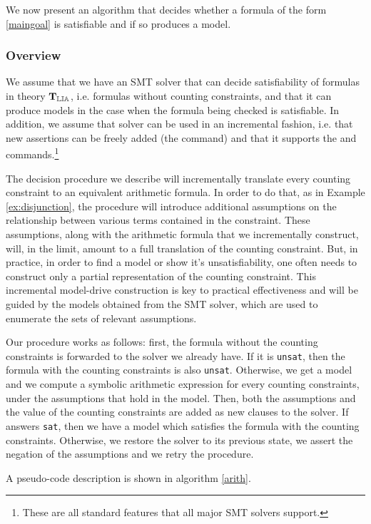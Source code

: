We now present an algorithm that decides whether a formula of the form
\ref{maingoal} is satisfiable and if so produces a model.

\subsubsection{Overview}

We assume that we have an SMT solver \solver that can decide
satisfiability of formulas in theory $\operatorname{\mathbf{T}_\mathbb{LIA}}$, i.e. formulas without
counting constraints, and that it can produce models in the case when
the formula being checked is satisfiable. In addition, we assume that
solver \solver can be used in an incremental fashion, i.e. that new
assertions can be freely added (the \assert command) and that it supports the \push and \pop
commands.\footnote{These are all standard features that all major SMT
solvers support.}

The decision procedure we describe will incrementally translate every
counting constraint to an equivalent arithmetic formula. In order to
do that, as in Example \ref{ex:disjunction}, the procedure will
introduce additional assumptions on the relationship between various
terms contained in the constraint. These assumptions, along with the
arithmetic formula that we incrementally construct, will, in the
limit, amount to a full translation of the counting constraint. But,
in practice, in order to find a model or show it's unsatisfiability,
one often needs to construct only a partial representation of the
counting constraint. This incremental model-drive construction is key
to practical effectiveness and will be guided by the models obtained
from the SMT solver, which are used to enumerate the sets of relevant
assumptions.

Our procedure works as follows: first, the formula without the
counting constraints is forwarded to the solver we already have. If it
is \texttt{unsat}, then the formula with the counting constraints is
also \texttt{unsat}. Otherwise, we get a model and we compute a
symbolic arithmetic expression for every counting constraints, under
the assumptions that hold in the model. Then, both the assumptions and
the value of the counting constraints are added as new clauses to the
solver. If \solver answers \texttt{sat}, then we have a model
which satisfies the formula with the counting constraints. Otherwise,
we restore the solver to its previous state, we assert the negation of
the assumptions and we retry the procedure.

A pseudo-code description is shown in algorithm \ref{arith}.

